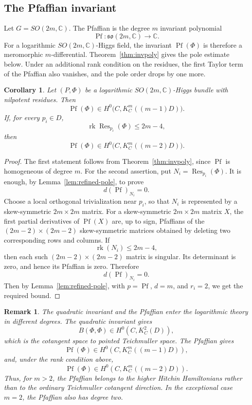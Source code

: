 \documentclass[10pt,a4paper]{amsart}
\numberwithin{equation}{section}
\newtheorem{corollary}[theorem]{Corollary}
\newtheorem{remark}[theorem]{Remark}
\begin{document}
\subsection{The Pfaffian invariant}

Let
\(
        G=SO(2m,\mathbb C).
\)
The Pfaffian is the degree \(m\) invariant polynomial
\[
        \operatorname{Pf}:\mathfrak{so}(2m,\mathbb C)\longrightarrow\mathbb C.
\]
For a logarithmic \(SO(2m,\mathbb C)\)-Higgs field, the invariant
\(
        \operatorname{Pf}(\Phi)
\)
is therefore a meromorphic \(m\)-differential.  Theorem~\ref{thm:invpoly}
gives the pole estimate below. Under an additional rank condition on the
residues, the first Taylor term of the Pfaffian also vanishes, and the pole
order drops by one more.

\begin{corollary}
\label{cor:pfaffian-log}
Let \((P,\Phi)\) be a logarithmic \(SO(2m,\mathbb C)\)-Higgs bundle with
nilpotent residues. Then
\[
        \operatorname{Pf}(\Phi)
        \in
        H^0\bigl(C,K_C^m((m-1)D)\bigr).
\]
If, for every \(p_i\in D\),
\[
        \operatorname{rk}\operatorname{Res}_{p_i}(\Phi)\leq 2m-4,
\]
then
\[
        \operatorname{Pf}(\Phi)
        \in
        H^0\bigl(C,K_C^m((m-2)D)\bigr).
\]
\end{corollary}

\begin{proof}
The first statement follows from Theorem~\ref{thm:invpoly}, since
\(\operatorname{Pf}\) is homogeneous of degree \(m\). For the second assertion, put
\(
        N_i=\operatorname{Res}_{p_i}(\Phi).
\)
It is enough, by Lemma~\ref{lem:refined-pole}, to prove
\[
        d(\operatorname{Pf})_{N_i}=0.
\]
Choose a local orthogonal trivialization near \(p_i\), so that
\(N_i\) is represented by a skew-symmetric \(2m\times 2m\) matrix. For a skew-symmetric \(2m\times 2m\) matrix \(X\), the first partial
derivatives of \(\operatorname{Pf}(X)\) are, up to sign, Pfaffians of the
\((2m-2)\times(2m-2)\) skew-symmetric matrices obtained by deleting two
corresponding rows and columns. If
\[
        \operatorname{rk}(N_i)\leq 2m-4,
\]
then each such \((2m-2)\times(2m-2)\) matrix is singular. Its determinant is
zero, and hence its Pfaffian is zero. Therefore
\[
        d(\operatorname{Pf})_{N_i}=0.
\]
Then by Lemma~\ref{lem:refined-pole}, with \(p=\operatorname{Pf}\), \(d=m\), and
\(r_i=2\), we get the required bound.
\end{proof}

\begin{remark}
The quadratic invariant and the Pfaffian enter the logarithmic theory in
different degrees. The quadratic invariant gives
\[
        B(\Phi,\Phi)\in H^0(C,K_C^2(D)),
\]
which is the cotangent space to pointed Teichmuller space. The Pfaffian gives
\[
        \operatorname{Pf}(\Phi)\in H^0(C,K_C^m((m-1)D)),
\]
and, under the rank condition above,
\[
        \operatorname{Pf}(\Phi)\in H^0(C,K_C^m((m-2)D)).
\]
Thus, for \(m>2\), the Pfaffian belongs to the higher Hitchin Hamiltonians
rather than to the ordinary Teichmuller cotangent direction.  In the exceptional
case \(m=2\), the Pfaffian also has degree two.
\end{remark}
\end{document}
